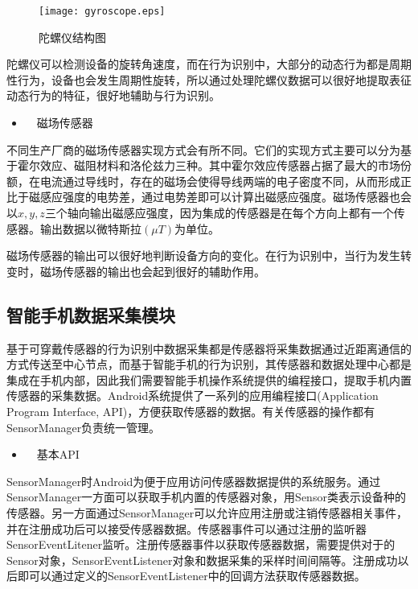 \begin{figure}[htb]
\centering
\texttt{[image: gyroscope.eps]}
\caption{陀螺仪结构图} \label{gyroscope}
\end{figure}

\par 陀螺仪可以检测设备的旋转角速度，而在行为识别中，大部分的动态行为都是周期性行为，设备也会发生周期性旋转，所以通过处理陀螺仪数据可以很好地提取表征动态行为的特征，很好地辅助与行为识别。

\begin{itemize}
	\item　磁场传感器
\end{itemize}
\par 不同生产厂商的磁场传感器实现方式会有所不同。它们的实现方式主要可以分为基于霍尔效应、磁阻材料和洛伦兹力三种。其中霍尔效应传感器占据了最大的市场份额，在电流通过导线时，存在的磁场会使得导线两端的电子密度不同，从而形成正比于磁感应强度的电势差，通过电势差即可以计算出磁感应强度。磁场传感器也会以$x,  y,  z$三个轴向输出磁感应强度，因为集成的传感器是在每个方向上都有一个传感器。输出数据以微特斯拉$(\mu T)$为单位。
\par 磁场传感器的输出可以很好地判断设备方向的变化。在行为识别中，当行为发生转变时，磁场传感器的输出也会起到很好的辅助作用。

\subsection{智能手机数据采集模块}
\par 基于可穿戴传感器的行为识别中数据采集都是传感器将采集数据通过近距离通信的方式传送至中心节点，而基于智能手机的行为识别，其传感器和数据处理中心都是集成在手机内部，因此我们需要智能手机操作系统提供的编程接口，提取手机内置传感器的采集数据。Android系统提供了一系列的应用编程接口(Application Program Interface, API)，方便获取传感器的数据。有关传感器的操作都有SensorManager负责统一管理。

\begin{itemize}
	\item　基本API
\end{itemize}
\par SensorManager时Android为便于应用访问传感器数据提供的系统服务。通过SensorManager一方面可以获取手机内置的传感器对象，用Sensor类表示设备种的传感器。另一方面通过SensorManager可以允许应用注册或注销传感器相关事件，并在注册成功后可以接受传感器数据。传感器事件可以通过注册的监听器SensorEventLitener监听。注册传感器事件以获取传感器数据，需要提供对于的Sensor对象，SensorEventListener对象和数据采集的采样时间间隔等。注册成功以后即可以通过定义的SensorEventListener中的回调方法获取传感器数据。

